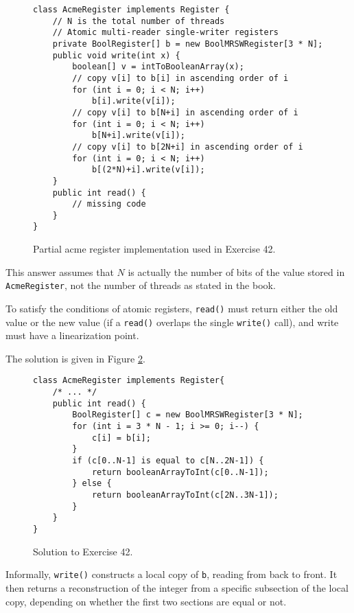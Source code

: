 \documentclass[a4paper,10pt]{article}
\begin{document}
\begin{figure}
\begin{lstlisting}
class AcmeRegister implements Register {
    // N is the total number of threads
    // Atomic multi-reader single-writer registers
    private BoolRegister[] b = new BoolMRSWRegister[3 * N];
    public void write(int x) {
        boolean[] v = intToBooleanArray(x);
        // copy v[i] to b[i] in ascending order of i
        for (int i = 0; i < N; i++)
            b[i].write(v[i]);
        // copy v[i] to b[N+i] in ascending order of i
        for (int i = 0; i < N; i++)
            b[N+i].write(v[i]);
        // copy v[i] to b[2N+i] in ascending order of i
        for (int i = 0; i < N; i++)
            b[(2*N)+i].write(v[i]);
    }
    public int read() {
        // missing code
    }
}
\end{lstlisting}
\caption{Partial acme register implementation used in Exercise 42.}
\label{fig:acmeregister}
\end{figure}

\vspace{3mm}

This answer assumes that $N$ is actually the number of bits of the value stored
in \lstinline|AcmeRegister|, not the number of threads as stated in the book.

To satisfy the conditions of atomic registers, \lstinline|read()| must return either
the old value or the new value (if a \lstinline|read()| overlaps the single \lstinline|write()| call),
and write must have a linearization point.

The solution is given in Figure \ref{fig:acmesolution}.

\begin{figure}
\begin{lstlisting}
class AcmeRegister implements Register{
    /* ... */
    public int read() {
        BoolRegister[] c = new BoolMRSWRegister[3 * N];
        for (int i = 3 * N - 1; i >= 0; i--) {
            c[i] = b[i];
        }
        if (c[0..N-1] is equal to c[N..2N-1]) {
            return booleanArrayToInt(c[0..N-1]);
        } else {
            return booleanArrayToInt(c[2N..3N-1]);
        }
    }
}
\end{lstlisting}
\caption{Solution to Exercise 42.}
\label{fig:acmesolution}
\end{figure}

Informally, \lstinline|write()| constructs a local copy of \lstinline|b|, reading
from back to front. It then returns a reconstruction of the integer from a specific subsection
of the local copy, depending on whether the first two sections are equal or not.
\end{document}
